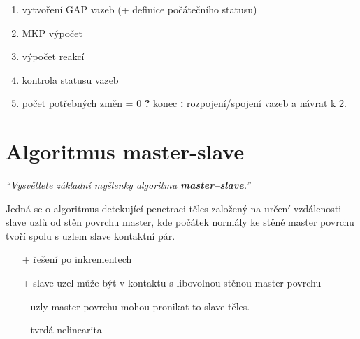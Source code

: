 \documentclass{article}
\begin{document}
	\begin{enumerate}
		\item vytvoření GAP vazeb (+ definice počátečního statusu)
		\item MKP výpočet
		\item výpočet reakcí
		\item kontrola statusu vazeb
		\item počet potřebných změn = 0 \textbf{?} konec \textbf{:} rozpojení/spojení vazeb a návrat k 2.
	\end{enumerate}

	\section{Algoritmus master-slave}
	\emph{``Vysvětlete základní myšlenky algoritmu \textbf{master–slave}.''}

	Jedná se o algoritmus detekující penetraci těles založený na určení vzdálenosti slave uzlů od stěn povrchu master, kde počátek normály ke stěně master povrchu tvoří spolu s uzlem slave kontaktní pár.

	\begin{itemize}
	\item [+] řešení po inkrementech
	\item [+] slave uzel může být v kontaktu s libovolnou stěnou master povrchu
	\item [--] uzly master povrchu mohou pronikat to slave těles.
	\item [--] tvrdá nelinearita
	\end{itemize}
\end{document}
